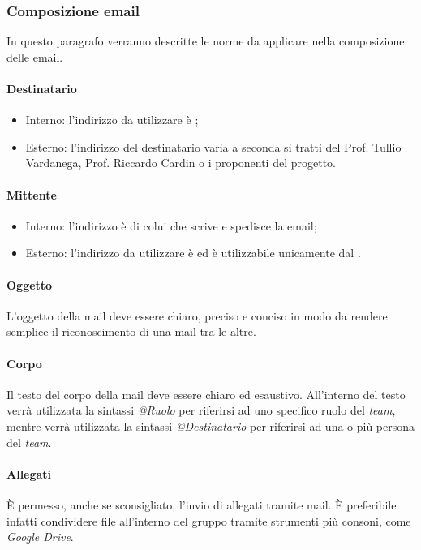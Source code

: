 \subsubsection{Composizione email}
In questo paragrafo verranno descritte le norme da applicare nella
composizione delle email.
\paragraph{Destinatario}
\begin{itemize}
  \item Interno: l'indirizzo da utilizzare è \textit{\email};
  \item Esterno: l'indirizzo del destinatario varia a seconda si tratti del
  Prof. Tullio Vardanega, Prof. Riccardo Cardin o i proponenti del progetto.
\end{itemize}
\paragraph{Mittente}
\begin{itemize}
  \item Interno: l'indirizzo è di colui che scrive e spedisce la email;
  \item Esterno: l'indirizzo da utilizzare è \textit{\email} ed è utilizzabile
  unicamente dal \textit{\RdP}.
\end{itemize}
\paragraph{Oggetto}
L'oggetto della mail deve essere chiaro, preciso e conciso in modo da rendere
semplice il riconoscimento di una mail tra le altre.
\paragraph{Corpo}
Il testo del corpo della mail deve essere chiaro ed esaustivo. All'interno del
testo verrà utilizzata la sintassi \textit{@Ruolo} per riferirsi ad uno specifico
ruolo del \textit{team}, mentre verrà utilizzata la sintassi \textit{@Destinatario} per
riferirsi ad una o più persona del \textit{team}.
\paragraph{Allegati}
È permesso, anche se sconsigliato, l'invio di allegati tramite mail. È
preferibile infatti condividere file all'interno del gruppo tramite strumenti più consoni, come \textit{Google
Drive}.
